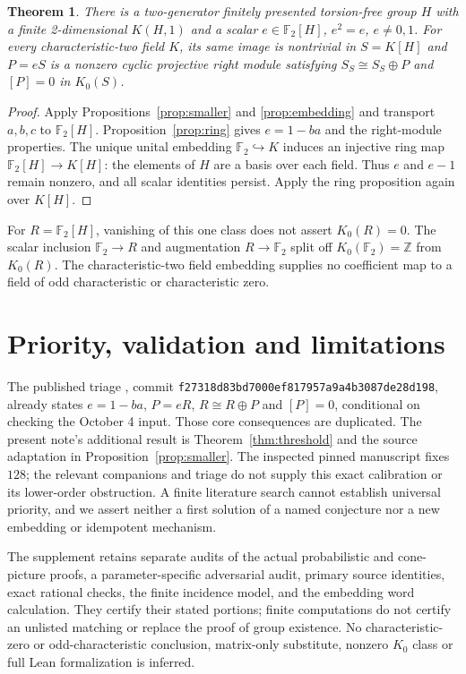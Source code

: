 \documentclass[11pt]{article}
\newtheorem{theorem}{Theorem}
\newcommand{\Ftwo}{\mathbb F_2}
\begin{document}
\begin{theorem}\label{thm:consequence}
There is a two-generator finitely presented torsion-free group $H$ with a
finite 2-dimensional $K(H,1)$ and a scalar $e\in\Ftwo[H]$, $e^2=e$,
$e\ne0,1$. For every characteristic-two field $K$, its same image is
nontrivial in $S=K[H]$ and $P=eS$ is a nonzero cyclic projective right
module satisfying $S_S\cong S_S\oplus P$ and $[P]=0$ in $K_0(S)$.
\end{theorem}
\begin{proof}
Apply Propositions~\ref{prop:smaller} and \ref{prop:embedding} and
transport $a,b,c$ to $\Ftwo[H]$. Proposition~\ref{prop:ring} gives
$e=1-ba$ and the right-module properties.
The unique unital embedding $\Ftwo\hookrightarrow K$ induces an injective
ring map $\Ftwo[H]\to K[H]$: the elements of $H$ are a basis over each
field. Thus $e$ and $e-1$ remain nonzero, and all scalar identities
persist. Apply the ring proposition again over $K[H]$.
\end{proof}

For $R=\Ftwo[H]$, vanishing of this one class does not assert
$K_0(R)=0$. The scalar inclusion $\Ftwo\to R$ and augmentation $R\to\Ftwo$ split off
$K_0(\Ftwo)=\mathbb Z$ from $K_0(R)$. The characteristic-two field
embedding supplies no coefficient map to a field of odd characteristic
or characteristic zero.

\section{Priority, validation and limitations}
The published triage \cite{Triage}, commit
\texttt{f27318d83bd7000ef817957a9a4b3087de28d198}, already states
$e=1-ba$, $P=eR$, $R\cong R\oplus P$ and $[P]=0$, conditional on
checking the October 4 input. Those core consequences are duplicated.
The present note's additional result is Theorem~\ref{thm:threshold}
and the source adaptation in Proposition~\ref{prop:smaller}.
The inspected pinned manuscript fixes $128$; the relevant companions
and triage do not supply this exact calibration or its lower-order
obstruction. A finite literature search cannot establish universal
priority, and we assert neither a first solution of a named conjecture
nor a new embedding or idempotent mechanism.

The supplement retains separate audits of the actual probabilistic and
cone-picture proofs, a parameter-specific adversarial audit, primary
source identities, exact rational checks, the finite incidence model,
and the embedding word calculation. They certify their stated portions;
finite computations do not certify an unlisted matching or replace the
proof of group existence. No characteristic-zero or odd-characteristic
conclusion, matrix-only substitute, nonzero $K_0$ class or full Lean
formalization is inferred.
\end{document}
